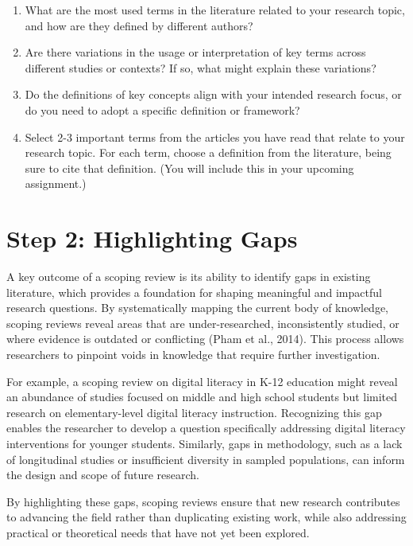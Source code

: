 \documentclass[
  letterpaper,
  DIV=11,
  numbers=noendperiod]{scrreprt}
\providecommand{\tightlist}{%
  \setlength{\itemsep}{0pt}\setlength{\parskip}{0pt}}\usepackage{longtable,booktabs,array}
\begin{document}
\begin{enumerate}
\def\labelenumi{\arabic{enumi}.}
\tightlist
\item
  What are the most used terms in the literature related to your
  research topic, and how are they defined by different authors?
\item
  Are there variations in the usage or interpretation of key terms
  across different studies or contexts? If so, what might explain these
  variations?
\item
  Do the definitions of key concepts align with your intended research
  focus, or do you need to adopt a specific definition or framework?
\item
  Select 2-3 important terms from the articles you have read that relate
  to your research topic. For each term, choose a definition from the
  literature, being sure to cite that definition. (You will include this
  in your upcoming assignment.)
\end{enumerate}

\section*{Step 2: Highlighting Gaps}\label{step-2-highlighting-gaps}


A key outcome of a scoping review is its ability to identify gaps in
existing literature, which provides a foundation for shaping meaningful
and impactful research questions. By systematically mapping the current
body of knowledge, scoping reviews reveal areas that are
under-researched, inconsistently studied, or where evidence is outdated
or conflicting (Pham et al., 2014). This process allows researchers to
pinpoint voids in knowledge that require further investigation.

For example, a scoping review on digital literacy in K-12 education
might reveal an abundance of studies focused on middle and high school
students but limited research on elementary-level digital literacy
instruction. Recognizing this gap enables the researcher to develop a
question specifically addressing digital literacy interventions for
younger students. Similarly, gaps in methodology, such as a lack of
longitudinal studies or insufficient diversity in sampled populations,
can inform the design and scope of future research.

By highlighting these gaps, scoping reviews ensure that new research
contributes to advancing the field rather than duplicating existing
work, while also addressing practical or theoretical needs that have not
yet been explored.
\end{document}
